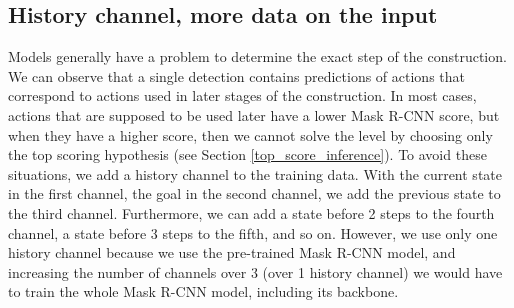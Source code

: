 \subsection{History channel, more data on the input}
\label{history_channel}
Models generally have a problem to determine the exact step of the construction. We can observe that a single detection contains predictions of actions that correspond to actions used in later stages of the construction. In most cases, actions that are supposed to be used later have a lower Mask {R-CNN} score, but when they have a higher score, then we cannot solve the level by choosing only the top scoring hypothesis (see Section \ref{top_score_inference}). To avoid these situations, we add a history channel to the training data. With the current state in the first channel, the goal in the second channel, we add the previous state to the third channel. Furthermore, we can add a state before 2 steps to the fourth channel, a state before 3 steps to the fifth, and so on. However, we use only one history channel because we use the pre-trained Mask {R-CNN} model, and increasing the number of channels over 3 (over 1 history channel) we would have to train the whole Mask {R-CNN} model, including its backbone.

